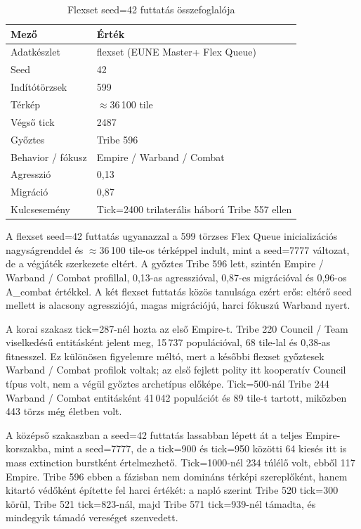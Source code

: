 ﻿\documentclass[a4paper,12pt]{report}
\begin{document}
\begin{table}[h]
\centering
\caption{Flexset seed=42 futtatás összefoglalója}
\label{tab:neurosim-run-fl42-summary}
\begin{tabular}{ll}
\hline
\textbf{Mező} & \textbf{Érték} \\
\hline
Adatkészlet & flexset (EUNE Master+ Flex Queue) \\
Seed & 42 \\
Indítótörzsek & 599 \\
Térkép & $\approx$36\,100 tile \\
Végső tick & 2487 \\
Győztes & Tribe 596 \\
Behavior / fókusz & Empire / Warband / Combat \\
Agresszió & 0,13 \\
Migráció & 0,87 \\
Kulcsesemény & Tick=2400 trilaterális háború Tribe 557 ellen \\
\hline
\end{tabular}
\end{table}

A flexset seed=42 futtatás ugyanazzal a 599 törzses Flex Queue inicializációs nagyságrenddel és $\approx$36\,100 tile-os térképpel indult, mint a seed=7777 változat, de a végjáték szerkezete eltért. A győztes Tribe 596 lett, szintén Empire / Warband / Combat profillal, 0,13-as agresszióval, 0,87-es migrációval és 0,96-os A\_combat értékkel. A két flexset futtatás közös tanulsága ezért erős: eltérő seed mellett is alacsony agressziójú, magas migrációjú, harci fókuszú Warband nyert.

A korai szakasz tick=287-nél hozta az első Empire-t. Tribe 220 Council / Team viselkedésű entitásként jelent meg, 15\,737 populációval, 68 tile-lal és 0,38-as fitnesszel. Ez különösen figyelemre méltó, mert a későbbi flexset győztesek Warband / Combat profilok voltak; az első fejlett polity itt kooperatív Council típus volt, nem a végül győztes archetípus előképe. Tick=500-nál Tribe 244 Warband / Combat entitásként 41\,042 populációt és 89 tile-t tartott, miközben 443 törzs még életben volt.

A középső szakaszban a seed=42 futtatás lassabban lépett át a teljes Empire-korszakba, mint a seed=7777, de a tick=900 és tick=950 közötti 64 kiesés itt is mass extinction burstként értelmezhető. Tick=1000-nél 234 túlélő volt, ebből 117 Empire. Tribe 596 ebben a fázisban nem domináns térképi szereplőként, hanem kitartó védőként építette fel harci értékét: a napló szerint Tribe 520 tick=300 körül, Tribe 521 tick=823-nál, majd Tribe 571 tick=939-nél támadta, és mindegyik támadó vereséget szenvedett.
\end{document}
